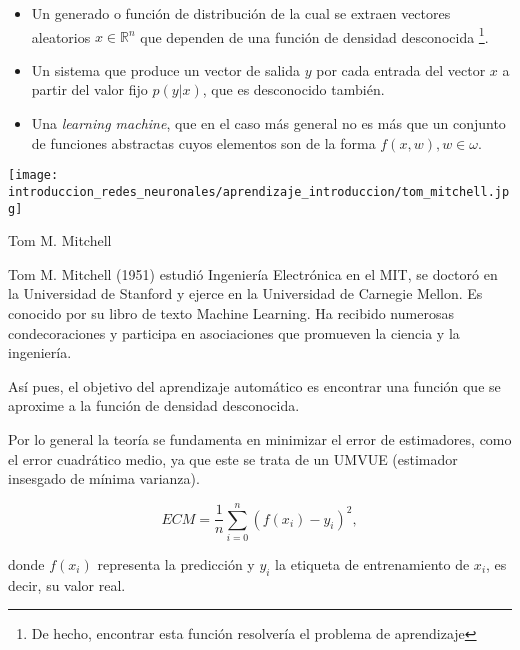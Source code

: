 \begin{itemize}
    \item Un generado o función de distribución de la cual se extraen 
    vectores aleatorios 
    $x \in \mathbb R^ n$ 
    que dependen de una función de densidad desconocida \footnote{De hecho, encontrar esta función resolvería el problema de aprendizaje}.
    
    \item Un sistema que produce un vector de salida $y$ por cada entrada del vector $x$ a partir del valor fijo $p(y|x)$, que es desconocido también. 
    
    \item Una \textit{learning machine}, que en el caso más general no es  más que un conjunto de funciones abstractas cuyos elementos son de la forma $f(x,w), w\in \omega$.
\end{itemize}

\begin{marginfigure}
    \texttt{[image: introduccion\_redes\_neuronales/aprendizaje\_introduccion/tom\_mitchell.jpg]}
   \caption{Tom M. Mitchell}
   \small
    Tom M. Mitchell (1951) estudió Ingeniería Electrónica en el MIT, 
    se doctoró en la Universidad de Stanford y ejerce en la Universidad de Carnegie Mellon. Es conocido por su libro 
    de texto Machine Learning. Ha recibido numerosas condecoraciones y 
   participa en asociaciones que promueven la ciencia y la ingeniería.
\end{marginfigure}



Así pues, el objetivo del aprendizaje automático es encontrar una función que se aproxime a la función de densidad desconocida.

Por lo general la teoría se fundamenta en minimizar el error de estimadores, como el error cuadrático medio, ya que este se trata de un UMVUE  (estimador insesgado de mínima varianza). 

$$ECM = \frac{1}{n} \sum_{i=0} ^n (f(x_i) - y_i)^2,$$

donde $f(x_i)$ representa la predicción y $y_i$ la etiqueta de entrenamiento de $x_i$, es decir, su valor real. 

